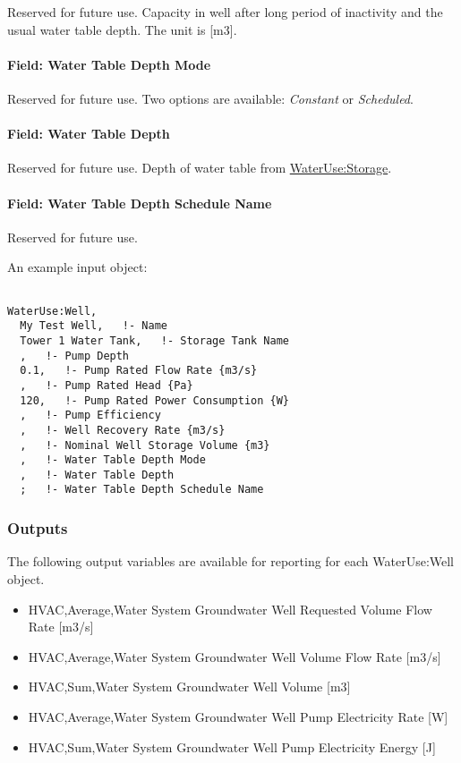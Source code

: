 Reserved for future use. Capacity in well after long period of inactivity and the usual water table depth. The unit is {[}m3{]}.

\paragraph{Field: Water Table Depth Mode}\label{field-water-table-depth-mode}

Reserved for future use. Two options are available: \emph{Constant} or \emph{Scheduled}.

\paragraph{Field: Water Table Depth}\label{field-water-table-depth}

Reserved for future use. Depth of water table from \hyperref[waterusestorage]{WaterUse:Storage}.

\paragraph{Field: Water Table Depth Schedule Name}\label{field-water-table-depth-schedule-name}

Reserved for future use.

An example input object:

\begin{lstlisting}

WaterUse:Well,
  My Test Well,   !- Name
  Tower 1 Water Tank,   !- Storage Tank Name
  ,   !- Pump Depth
  0.1,   !- Pump Rated Flow Rate {m3/s}
  ,   !- Pump Rated Head {Pa}
  120,   !- Pump Rated Power Consumption {W}
  ,   !- Pump Efficiency
  ,   !- Well Recovery Rate {m3/s}
  ,   !- Nominal Well Storage Volume {m3}
  ,   !- Water Table Depth Mode
  ,   !- Water Table Depth
  ;   !- Water Table Depth Schedule Name
\end{lstlisting}

\subsubsection{Outputs}\label{outputs-4-019}

The following output variables are available for reporting for each WaterUse:Well object.

\begin{itemize}
\item
  HVAC,Average,Water System Groundwater Well Requested Volume Flow Rate {[}m3/s{]}
\item
  HVAC,Average,Water System Groundwater Well Volume Flow Rate {[}m3/s{]}
\item
  HVAC,Sum,Water System Groundwater Well Volume {[}m3{]}
\item
  HVAC,Average,Water System Groundwater Well Pump Electricity Rate {[}W{]}
\item
  HVAC,Sum,Water System Groundwater Well Pump Electricity Energy {[}J{]}
\end{itemize}

